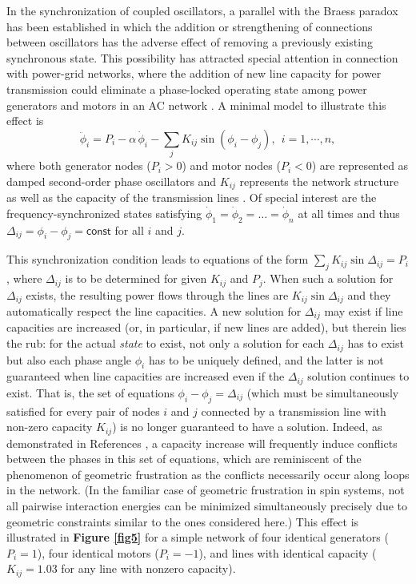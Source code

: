 \documentclass[
preprint,
superscriptaddress,
aps,
prl,
]{revtex4-1}
\begin{document}
{\color{black}
In the synchronization of coupled oscillators, a parallel with the Braess paradox has been established in which the addition or strengthening of connections between oscillators has the adverse effect of removing a previously existing  
synchronous state.  This possibility has attracted special attention in connection with power-grid networks, where the addition of new line capacity for power transmission could eliminate a phase-locked operating state among power generators and motors in an AC network \cite{witthaut2012braess,coletta2016linear}. A minimal model to illustrate this effect is 
 \begin{equation}
\ddot{\phi}_i=P_i-\alpha \, \dot{\phi}_i-\sum_j K_{ij} \sin (\phi_i-\phi_j), ~~ i = 1, \cdots, n,
\label{eq3}
\end{equation} 
where both generator nodes ($P_i>0$) and 
motor nodes ($P_i<0$) 
are represented as damped second-order  phase oscillators and $K_{ij}$ represents the network structure as well as the capacity of the transmission lines \cite{filatrella2008analysis,rohden2012self}.
Of special interest are the frequency-synchronized states satisfying $\dot{\phi}_1=\dot{\phi}_2=\dots =\dot{\phi}_n$ at all times and thus $\Delta_{ij}=\phi_i-\phi_j=\textsf{const}$ for all $i$ and $j$. 

This synchronization condition leads to equations of the form $\sum_j K_{ij} \sin \Delta_{ij}=P_i$, where $\Delta_{ij}$ is to be determined for given  $K_{ij}$ and $P_j$.  
When  such a solution for  $\Delta_{ij}$ exists,  the resulting power flows through the lines are $K_{ij} \sin \Delta_{ij}$ and they automatically respect the line capacities.  
A new solution for $\Delta_{ij}$ 
may exist if line capacities are increased (or, in particular, if
new lines are added), 
but therein lies the rub: for the actual {\it state} to exist, not only a solution for each $\Delta_{ij}$ has to exist but also each phase angle $\phi_i$ has to be uniquely defined,  and the latter is not guaranteed when line capacities 
 are increased 
 even if the $\Delta_{ij}$ solution continues to exist.
  That is, the set of equations $\phi_i-\phi_j = \Delta_{ij}$  (which must be simultaneously satisfied for every pair of nodes $i$ and $j$ connected by a  transmission 
 line with non-zero capacity $K_{ij}$) is no longer guaranteed to have a solution. 
 Indeed, as demonstrated in References \cite{witthaut2012braess,witthaut2013nonlocal}, 
 a capacity increase will frequently induce  conflicts between the 
 phases in this set of equations, which are reminiscent of the phenomenon of geometric frustration as the conflicts necessarily occur along loops in the network.
 (In the familiar case of geometric frustration in spin systems, not all pairwise interaction energies can be minimized simultaneously
 precisely due to geometric constraints similar to the ones considered here.) 
 This effect is illustrated in \textbf{Figure \ref{fig5}} for a simple network of four identical generators ($P_i=1$), four identical 
 motors ($P_i=-1$), and lines with identical capacity ($K_{ij}=1.03$ for any line with nonzero capacity).
}
\end{document}
